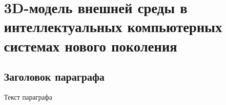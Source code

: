 
\chapter{3D-модель внешней среды в интеллектуальных компьютерных системах нового поколения}
\label{chapter_3d_models}


\section{Заголовок параграфа}
Текст параграфа

%